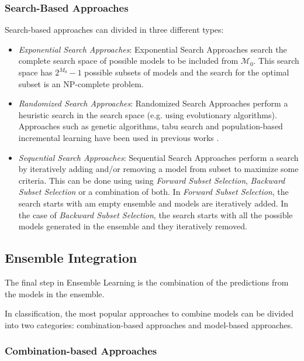 \subsubsection{Search-Based Approaches}

Search-based approaches can divided in three different types:

\begin{itemize}
	\item \textit{Exponential Search Approaches}: Exponential Search Approaches search the complete search space of possible models to be included from $\mathcal{M}_0$. This search space has $2^{M_0} - 1$ possible subsets of models and the search for the optimal subset is an NP-complete problem.
	
	\item \textit{Randomized Search Approaches}: Randomized Search Approaches perform a heuristic search in the search space (e.g. using evolutionary algorithms). Approaches such as genetic algorithms, tabu search and population-based incremental learning have been used in previous works \cite{Ruta2001}.
	
	\item \textit{Sequential Search Approaches}: Sequential Search Approaches perform a search by iteratively adding and/or removing a model from subset to maximize some criteria.
	This can be done using using \textit{Forward Subset Selection}, \textit{Backward Subset Selection} or a combination of both.
	In \textit{Forward Subset Selection}, the search starts with am empty ensemble and models are iteratively added.
	In the case of \textit{Backward Subset Selection}, the search starts with all the possible models generated in the ensemble and they iteratively removed.
\end{itemize}

\subsection{Ensemble Integration}

The final step in Ensemble Learning is the combination of the predictions from the models in the ensemble.

In classification, the most popular approaches to combine models can be divided into two categories: combination-based approaches and model-based approaches.

\subsubsection{Combination-based Approaches}

